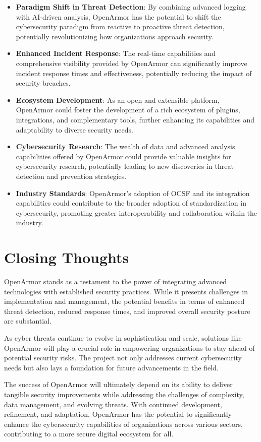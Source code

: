 \begin{itemize}
    \item \textbf{Paradigm Shift in Threat Detection}: By combining advanced logging with AI-driven analysis, OpenArmor has the potential to shift the cybersecurity paradigm from reactive to proactive threat detection, potentially revolutionizing how organizations approach security.
    
    \item \textbf{Enhanced Incident Response}: The real-time capabilities and comprehensive visibility provided by OpenArmor can significantly improve incident response times and effectiveness, potentially reducing the impact of security breaches.
    
    \item \textbf{Ecosystem Development}: As an open and extensible platform, OpenArmor could foster the development of a rich ecosystem of plugins, integrations, and complementary tools, further enhancing its capabilities and adaptability to diverse security needs.
    
    \item \textbf{Cybersecurity Research}: The wealth of data and advanced analysis capabilities offered by OpenArmor could provide valuable insights for cybersecurity research, potentially leading to new discoveries in threat detection and prevention strategies.
    
    \item \textbf{Industry Standards}: OpenArmor's adoption of OCSF and its integration capabilities could contribute to the broader adoption of standardization in cybersecurity, promoting greater interoperability and collaboration within the industry.
\end{itemize}

\section{Closing Thoughts}

OpenArmor stands as a testament to the power of integrating advanced technologies with established security practices. While it presents challenges in implementation and management, the potential benefits in terms of enhanced threat detection, reduced response times, and improved overall security posture are substantial.

As cyber threats continue to evolve in sophistication and scale, solutions like OpenArmor will play a crucial role in empowering organizations to stay ahead of potential security risks. The project not only addresses current cybersecurity needs but also lays a foundation for future advancements in the field.

The success of OpenArmor will ultimately depend on its ability to deliver tangible security improvements while addressing the challenges of complexity, data management, and evolving threats. With continued development, refinement, and adaptation, OpenArmor has the potential to significantly enhance the cybersecurity capabilities of organizations across various sectors, contributing to a more secure digital ecosystem for all.